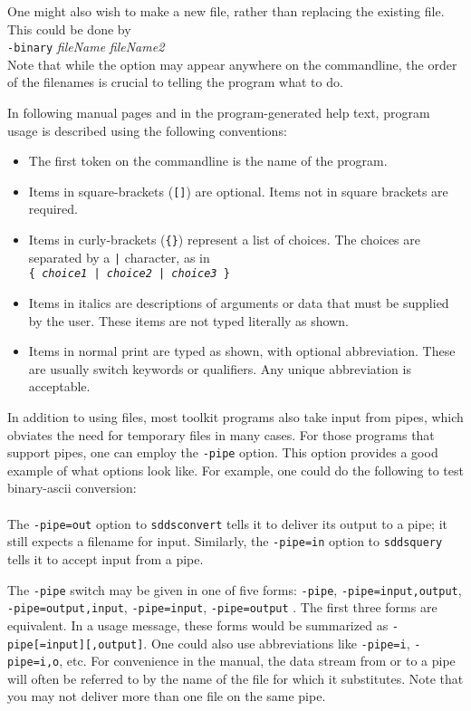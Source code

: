 \documentclass[11pt]{article}
\begin{document}
One might also wish to make a new file, rather than replacing the existing file.  This could be done by\\
\hspace*{5mm}{\tt sddsconvert} {\tt -binary} {\em fileName} {\em fileName2} \\
Note that while the option may appear anywhere on the commandline, the order of the filenames is crucial to
telling the program what to do.

In following manual pages and in the program-generated help text, program usage is described using the following
conventions:
\begin{itemize}
\item The first token on the commandline  is the name of the program.
\item Items in square-brackets ({\tt []}) are optional.  Items not in square brackets are required.
\item Items in curly-brackets ({\tt \{\}}) represent a list of choices.  The choices are separated by
a \verb+|+ character, as in\\
{\tt \{ {\em choice1} | {\em choice2} | {\em choice3} \}}
\item Items in italics are descriptions of arguments or data that must be supplied by the user.  These items are not typed 
literally as shown.
\item Items in normal print are typed as shown, with optional abbreviation.  These are
usually switch keywords or qualifiers.  Any unique abbreviation is acceptable.
\end{itemize}

In addition to using files, most toolkit programs also take input from pipes, which obviates the need for temporary
files in many cases.  For those programs that support pipes, one can employ the {\tt -pipe} option.  This option
provides a good example of what options look like.  For example, one could do the following to test binary-ascii
conversion:\\
\\
The {\tt -pipe=out} option to {\tt sddsconvert} tells it to deliver its output to a pipe; it still
expects a filename for input.  Similarly, the {\tt -pipe=in} option to {\tt sddsquery} tells it to
accept input from a pipe.  

The {\tt -pipe} switch may be given in one of five forms: {\tt -pipe}, {\tt -pipe=input,output}, {\tt
-pipe=output,input}, {\tt -pipe=input}, {\tt -pipe=output} .  The first three forms are equivalent.  In a usage
message, these forms would be summarized as {\tt -pipe[=input][,output]}.  One could also use abbreviations like
{\tt -pipe=i}, {\tt -pipe=i,o}, etc.  For convenience in the manual, the data stream from or to a pipe will 
often be referred to by the name of the file for which it substitutes.  Note that you may not deliver more
than one file on the same pipe.
\end{document}
